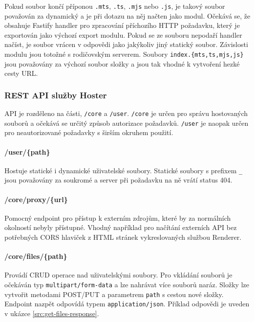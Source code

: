Pokud soubor končí příponou \lstinline|.mts|, \lstinline|.ts|, \lstinline|.mjs| nebo \lstinline|.js|, je takový soubor považován za dynamický a je při dotazu na něj načten jako modul. Očekává se, že obsahuje Fastify handler pro zpracování příchozího HTTP požadavku, který je exportován jako výchozí export modulu. Pokud se ze souboru nepodaří handler načíst, je soubor vrácen v odpovědi jako jakýkoliv jiný statický soubor. Závislosti modulu jsou totožné s rodičovským serverem. Soubory \lstinline|index.{mts,ts,mjs,js}| jsou považovány za výchozí soubor složky a jsou tak vhodné k vytvoření hezké cesty URL.

\subsubsection{REST API služby Hoster}
API je rozděleno na části, \lstinline|/core| a \lstinline|/user|. \lstinline|/core| je určen pro správu hostovaných souborů a očekává se určitý způsob autorizace požadavků. \lstinline|/user| je naopak určen pro neautorizované požadavky s širším okruhem použití.

\paragraph*{/user/\{path\}} Hostuje statické i dynamické uživatelské soubory. Statické soubory s prefixem \lstinline{_} jsou považovány za soukromé a server při požadavku na ně vrátí status 404.

\paragraph*{/core/proxy/\{url\}}
Pomocný endpoint pro přístup k externím zdrojům, které by za normálních okolností nebyly přístupné. Vhodný například pro načítání externích API bez potřebných CORS hlaviček z HTML stránek vykreslovaných službou Renderer.

\paragraph*{/core/files/\{path\}}
Provádí CRUD operace nad uživatelskými soubory. Pro vkládání souborů je očekáván typ \lstinline|multipart/form-data| a lze nahrávat více souborů naráz. Složky lze vytvořit metodami POST/PUT a parametrem \lstinline|path| s cestou nové složky. Endpoint nazpět odpovídá typem \lstinline|application/json|. Příklad odpovědi je uveden v ukázce \ref{src:get-files-response}.

